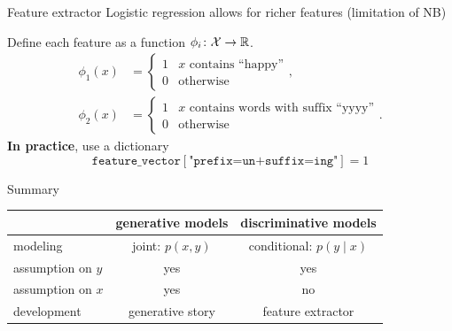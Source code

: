 \documentclass[usenames,dvipsnames,notes,11pt,aspectratio=169]{beamer}
\newcommand{\pdfnote}[1]{}
\begin{document}
\begin{frame}
    {Feature extractor}
    Logistic regression allows for richer features (limitation of NB)

    \medskip
    Define each feature as a function $\phi_i\colon \mathcal{X} \rightarrow \mathbb{R}$.
    \begin{align*}
 \phi_1(x) &= \begin{cases}
 1 & \text{$x$ contains ``happy''} \\
 0 & \text{otherwise}
 \end{cases} ,
 \\
 \phi_2(x) &= \begin{cases}
 1 & \text{$x$ contains words with suffix ``yyyy''} \\
 0 & \text{otherwise}
 \end{cases} .
    \end{align*}
    {\bf In practice}, use a dictionary
    $$
    \texttt{feature\_vector}[\texttt{"prefix=un+suffix=ing"}] = 1
    $$
    \pdfnote{
        With NB, we can still include these features as variables, but we'll have to think about modeling them as a parametrized distribution and handling the sparsity problem during estimation.
    }
\end{frame}

\begin{frame}
    {Summary}
    \begin{table}
        \renewcommand{\arraystretch}{1.5}
        \begin{tabular}{lcc}
            & generative models & discriminative models \\
            \hline
            modeling & joint: $p(x,y)$ & conditional: $p(y\mid x)$ \\
            assumption on $y$ & yes & yes \\
            assumption on $x$ & yes & no \\
            development & generative story & feature extractor
        \end{tabular}
    \end{table}
    \pdfnote{
        In Naive Bayes model, we used Bayes rule to get $p(y\mid x)$ given $p(x\mid y)$ and the class prior $p(y)$.
        But one question here is, if $p(y\mid x)$ is what we are ultimately interested in, why bother modeling the data likelihood and the prior as opposed to directly modeling $p(y\mid x)$.
    }
\end{frame}
\end{document}
